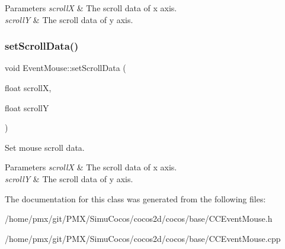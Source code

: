 \begin{DoxyParams}{Parameters}
{\em scrollX} & The scroll data of x axis. \\
\hline
{\em scrollY} & The scroll data of y axis. \\
\hline
\end{DoxyParams}
\mbox{\label{classEventMouse_a8fb8c094794f11764abac87bb336e2a7}} 
\subsubsection{\texorpdfstring{set\+Scroll\+Data()}{setScrollData()}\hspace{0.1cm}{\footnotesize\ttfamily [2/2]}}
{\footnotesize\ttfamily void Event\+Mouse\+::set\+Scroll\+Data (\begin{DoxyParamCaption}\item[{float}]{scrollX,  }\item[{float}]{scrollY }\end{DoxyParamCaption})\hspace{0.3cm}{\ttfamily [inline]}}

Set mouse scroll data.


\begin{DoxyParams}{Parameters}
{\em scrollX} & The scroll data of x axis. \\
\hline
{\em scrollY} & The scroll data of y axis. \\
\hline
\end{DoxyParams}


The documentation for this class was generated from the following files\+:\begin{DoxyCompactItemize}
\item 
/home/pmx/git/\+P\+M\+X/\+Simu\+Cocos/cocos2d/cocos/base/C\+C\+Event\+Mouse.\+h\item 
/home/pmx/git/\+P\+M\+X/\+Simu\+Cocos/cocos2d/cocos/base/C\+C\+Event\+Mouse.\+cpp\end{DoxyCompactItemize}

